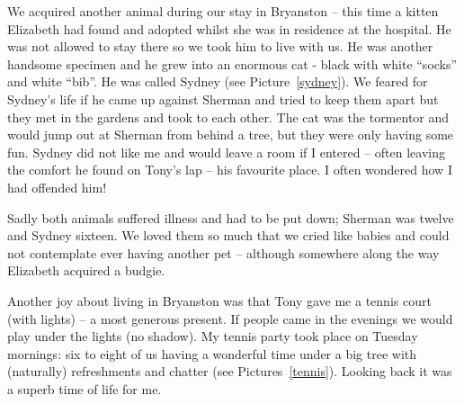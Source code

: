 


We acquired another animal during our stay in Bryanston -- this time a
kitten Elizabeth had found and adopted whilst she was in residence at
the hospital. He was not allowed to stay there so we took him to live
with us. He was another handsome specimen and he grew into an enormous
cat - black with white ``socks'' and white ``bib''. He was called
Sydney (see Picture~\ref{sydney}). We feared for Sydney's life if he
came up against Sherman and tried to keep them apart but they met in
the gardens and took to each other. The cat was the tormentor and
would jump out at Sherman from behind a tree, but they were only
having some fun. Sydney did not like me and would leave a room if I
entered -- often leaving the comfort he found on Tony's lap -- his
favourite place. I often wondered how I had offended him!


Sadly both animals suffered illness and had to be put down; Sherman
was twelve and Sydney sixteen. We loved them so much that we cried
like babies and could not contemplate ever having another pet --
although somewhere along the way Elizabeth acquired a budgie.

Another joy about living in Bryanston was that Tony gave me a tennis
court (with lights) -- a most generous present. If people came in the
evenings we would play under the lights (no shadow). My tennis party
took place on Tuesday mornings: six to eight of us having a wonderful
time under a big tree with (naturally) refreshments and chatter (see
Pictures~\ref{tennis}). Looking back it was a superb time of life for
me.

